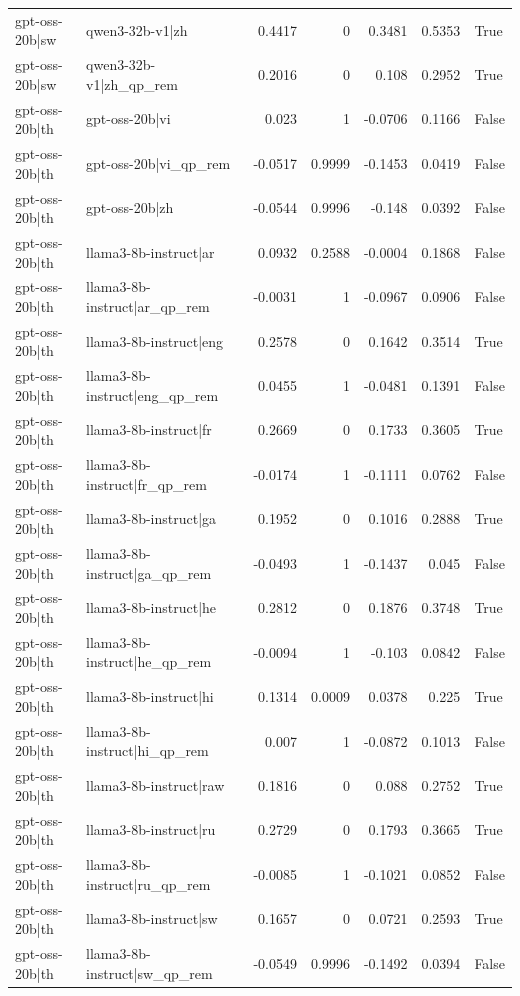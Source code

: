 \begin{table}
\begin{tabular}{l l r r r r l}
gpt-oss-20b|sw & qwen3-32b-v1|zh & 0.4417 & 0 & 0.3481 & 0.5353 & True \\
gpt-oss-20b|sw & qwen3-32b-v1|zh_qp_rem & 0.2016 & 0 & 0.108 & 0.2952 & True \\
gpt-oss-20b|th & gpt-oss-20b|vi & 0.023 & 1 & -0.0706 & 0.1166 & False \\
gpt-oss-20b|th & gpt-oss-20b|vi_qp_rem & -0.0517 & 0.9999 & -0.1453 & 0.0419 & False \\
gpt-oss-20b|th & gpt-oss-20b|zh & -0.0544 & 0.9996 & -0.148 & 0.0392 & False \\
gpt-oss-20b|th & llama3-8b-instruct|ar & 0.0932 & 0.2588 & -0.0004 & 0.1868 & False \\
gpt-oss-20b|th & llama3-8b-instruct|ar_qp_rem & -0.0031 & 1 & -0.0967 & 0.0906 & False \\
gpt-oss-20b|th & llama3-8b-instruct|eng & 0.2578 & 0 & 0.1642 & 0.3514 & True \\
gpt-oss-20b|th & llama3-8b-instruct|eng_qp_rem & 0.0455 & 1 & -0.0481 & 0.1391 & False \\
gpt-oss-20b|th & llama3-8b-instruct|fr & 0.2669 & 0 & 0.1733 & 0.3605 & True \\
gpt-oss-20b|th & llama3-8b-instruct|fr_qp_rem & -0.0174 & 1 & -0.1111 & 0.0762 & False \\
gpt-oss-20b|th & llama3-8b-instruct|ga & 0.1952 & 0 & 0.1016 & 0.2888 & True \\
gpt-oss-20b|th & llama3-8b-instruct|ga_qp_rem & -0.0493 & 1 & -0.1437 & 0.045 & False \\
gpt-oss-20b|th & llama3-8b-instruct|he & 0.2812 & 0 & 0.1876 & 0.3748 & True \\
gpt-oss-20b|th & llama3-8b-instruct|he_qp_rem & -0.0094 & 1 & -0.103 & 0.0842 & False \\
gpt-oss-20b|th & llama3-8b-instruct|hi & 0.1314 & 0.0009 & 0.0378 & 0.225 & True \\
gpt-oss-20b|th & llama3-8b-instruct|hi_qp_rem & 0.007 & 1 & -0.0872 & 0.1013 & False \\
gpt-oss-20b|th & llama3-8b-instruct|raw & 0.1816 & 0 & 0.088 & 0.2752 & True \\
gpt-oss-20b|th & llama3-8b-instruct|ru & 0.2729 & 0 & 0.1793 & 0.3665 & True \\
gpt-oss-20b|th & llama3-8b-instruct|ru_qp_rem & -0.0085 & 1 & -0.1021 & 0.0852 & False \\
gpt-oss-20b|th & llama3-8b-instruct|sw & 0.1657 & 0 & 0.0721 & 0.2593 & True \\
gpt-oss-20b|th & llama3-8b-instruct|sw_qp_rem & -0.0549 & 0.9996 & -0.1492 & 0.0394 & False \\

\end{tabular}
\end{table}
